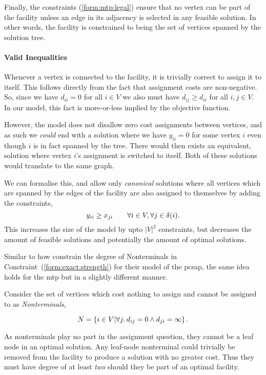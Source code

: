  Finally, the constraints (\ref{form:mtp:legal}) ensure that no vertex can be part
 of the facility unless an edge in its adjacency is selected in any feasible solution.
 In other words, the facility is constrained to being
 the set of vertices spanned by the solution tree.

 \paragraph{Valid Inequalities}
 Whenever a vertex is connected to the facility, it is trivially correct to assign it to itself.
 This follows directly from the fact that assignment costs are non-negative. So, since we have $d_{ii} = 0$
 for all $i \in V$
 we also must have $d_{ij} \geq d_{ii}$
 for all $i,j \in V$.
 In our model, this fact is more-or-less implied by the objective function.
 
 However, the model does not disallow zero cost assignments between
 vertices, and as such we \textit{could} end with a solution where we have $y_{ii} = 0$ for some
 vertex $i$ even though $i$ is in fact spanned by the tree. There would then exists an equivalent,
 solution where vertex $i$'s assignment is switched to itself. Both of these solutions would translate
 to the same graph.

 We can formalise this, and allow only \textit{canonical} solutions where all vertices
 which are spanned by the edges of the facility are also assigned to themselves by
 adding the constraints,
 \begin{equation}\label{form:mtp:str}
 y_{ii} \geq x_{ji} \qquad \forall i \in V,  \forall j \in \delta(i)\mathnormal{.}
\end{equation}
This increases the size of the model by upto $|V|^2$ constraints, but
decreases the amount of feasible solutions and potentially the amount of optimal solutions.
\smallskip

Similar to how \citet{ljubic2005solving} constrain the degree of Nonterminals in
Constraint~(\ref{form:exact:strength}) for their model of the \gls{pcsap},
the same idea holds for the \gls{mtp} but in a slightly different manner.

 Consider the set of vertices which cost nothing to assign and cannot be assigned to as \textit{Nonterminals},

 \[N = \left\{ i \in V \middle\vert \forall j.\: d_{ij} = 0 \wedge   d_{ji} = \infty\right\}\mathnormal{.}\]

 As nonterminals play no part in the assignment question,
 they cannot be a leaf node in an optimal solution.
 Any leaf-node nonterminal could trivially
 be removed from the facility to produce a solution with no greater cost.
 Thus they must have degree of at least
 \textit{two} should they be part of an optimal facility.

